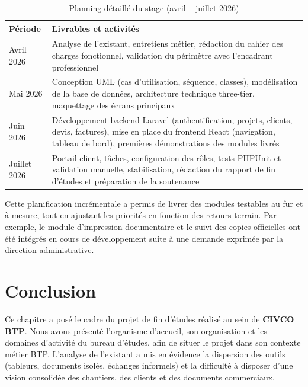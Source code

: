 \begin{table}[H]
\centering
\caption{Planning détaillé du stage (avril -- juillet 2026)}
\label{tab:planning_detail}
\small
\begin{tabularx}{\textwidth}{|l|X|}
\hline
\textbf{Période} & \textbf{Livrables et activités} \\
\hline
Avril 2026 &
Analyse de l'existant, entretiens métier, rédaction du cahier des charges fonctionnel,
validation du périmètre avec l'encadrant professionnel \\
\hline
Mai 2026 &
Conception UML (cas d'utilisation, séquence, classes), modélisation de la base de données,
architecture technique three-tier, maquettage des écrans principaux \\
\hline
Juin 2026 &
Développement backend Laravel (authentification, projets, clients, devis, factures),
mise en place du frontend React (navigation, tableau de bord), premières démonstrations
des modules livrés \\
\hline
Juillet 2026 &
Portail client, tâches, configuration des rôles, tests PHPUnit et validation manuelle,
stabilisation, rédaction du rapport de fin d'études et préparation de la soutenance \\
\hline
\end{tabularx}
\end{table}

\medskip

Cette planification incrémentale a permis de livrer des modules testables au fur
et à mesure, tout en ajustant les priorités en fonction des retours terrain.
Par exemple, le module d'impression documentaire et le suivi des copies officielles
ont été intégrés en cours de développement suite à une demande exprimée par la
direction administrative.

\newpage
\section*{Conclusion}

Ce chapitre a posé le cadre du projet de fin d'études réalisé au sein de
\textbf{CIVCO BTP}. Nous avons présenté l'organisme d'accueil, son organisation
et les domaines d'activité du bureau d'études, afin de situer le projet dans son
contexte métier BTP. L'analyse de l'existant a mis en évidence la dispersion des
outils (tableurs, documents isolés, échanges informels) et la difficulté à disposer
d'une vision consolidée des chantiers, des clients et des documents commerciaux.

